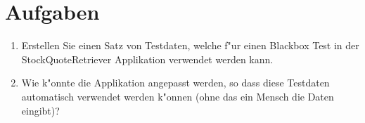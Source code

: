 \section{Aufgaben}
\begin{enumerate}
\item Erstellen Sie einen Satz von Testdaten, welche f"ur einen Blackbox Test in der
StockQuoteRetriever Applikation verwendet werden kann.
\item Wie k"onnte die Applikation angepasst werden, so dass diese Testdaten
automatisch verwendet werden k"onnen (ohne das ein Mensch die Daten eingibt)?
\end{enumerate}
\newpage


